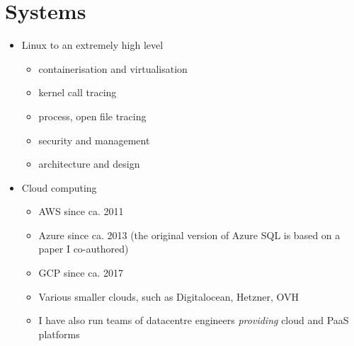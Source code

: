 \section{Systems}

\begin{itemize}
\item Linux to an extremely high level
  \begin{itemize}
  \item containerisation and virtualisation
  \item kernel call tracing
  \item process, open file tracing
  \item security and management
  \item architecture and design
  \end{itemize}
\item Cloud computing
  \begin{itemize}
  \item AWS since ca. 2011
  \item Azure since ca. 2013 (the original version of Azure SQL is based on a paper I co-authored)
  \item GCP since ca. 2017
  \item Various smaller clouds, such as Digitalocean, Hetzner, OVH
  \item I have also run teams of datacentre engineers \textit{providing} cloud and PaaS platforms
  \end{itemize}
\end{itemize}
